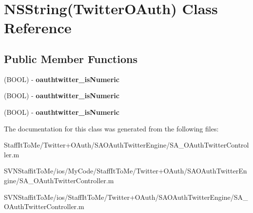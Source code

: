 \hypertarget{interface_n_s_string_07_twitter_o_auth_08}{
\section{\-N\-S\-String(\-Twitter\-O\-Auth) \-Class \-Reference}
\label{interface_n_s_string_07_twitter_o_auth_08}
}
\subsection*{\-Public \-Member \-Functions}
\begin{DoxyCompactItemize}
\item 
\hypertarget{interface_n_s_string_07_twitter_o_auth_08_ab84cd79c08be95be625551a419bed3fd}{
(\-B\-O\-O\-L) -\/ {\bfseries oauthtwitter\-\_\-is\-Numeric}}
\label{interface_n_s_string_07_twitter_o_auth_08_ab84cd79c08be95be625551a419bed3fd}

\item 
\hypertarget{interface_n_s_string_07_twitter_o_auth_08_ab84cd79c08be95be625551a419bed3fd}{
(\-B\-O\-O\-L) -\/ {\bfseries oauthtwitter\-\_\-is\-Numeric}}
\label{interface_n_s_string_07_twitter_o_auth_08_ab84cd79c08be95be625551a419bed3fd}

\item 
\hypertarget{interface_n_s_string_07_twitter_o_auth_08_ab84cd79c08be95be625551a419bed3fd}{
(\-B\-O\-O\-L) -\/ {\bfseries oauthtwitter\-\_\-is\-Numeric}}
\label{interface_n_s_string_07_twitter_o_auth_08_ab84cd79c08be95be625551a419bed3fd}

\end{DoxyCompactItemize}


\-The documentation for this class was generated from the following files\-:\begin{DoxyCompactItemize}
\item 
\-Staff\-It\-To\-Me/\-Twitter+\-O\-Auth/\-S\-A\-O\-Auth\-Twitter\-Engine/\-S\-A\-\_\-\-O\-Auth\-Twitter\-Controller.\-m\item 
\-S\-V\-N\-Staffit\-To\-Me/ios/\-My\-Code/\-Staff\-It\-To\-Me/\-Twitter+\-O\-Auth/\-S\-A\-O\-Auth\-Twitter\-Engine/\-S\-A\-\_\-\-O\-Auth\-Twitter\-Controller.\-m\item 
\-S\-V\-N\-Staffit\-To\-Me/ios/\-Staff\-It\-To\-Me/\-Twitter+\-O\-Auth/\-S\-A\-O\-Auth\-Twitter\-Engine/\-S\-A\-\_\-\-O\-Auth\-Twitter\-Controller.\-m\end{DoxyCompactItemize}
